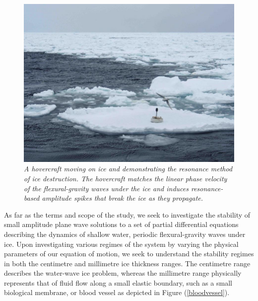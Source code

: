 \documentclass{article}
\begin{document}
\begin{figure}[hbt!] 
\centering
\includegraphics[scale = .4]{icewaves.jpg}
\caption{ \emph{A hovercraft moving on ice and demonstrating the resonance method of ice destruction. The hovercraft matches the linear phase velocity of the flexural-gravity waves under the ice and induces resonance-based amplitude spikes that break the ice as they propagate.}}\label{icewaves}
\end{figure}


 As far as the terms and scope of the study, we seek to investigate the stability of small amplitude plane wave solutions to a set of partial differential equations describing the dynamics of shallow water, periodic flexural-gravity waves under ice. Upon investigating various regimes of the system by varying the physical parameters of our equation of motion, we seek to understand the stability regimes in both the centimetre and millimetre ice thickness ranges. The centimetre range describes the water-wave ice problem, whereas the millimetre range physically represents that of fluid flow along a small elastic boundary, such as a small biological membrane, or blood vessel as depicted in Figure (\ref{bloodvessel}).  \\
 
\end{document}
